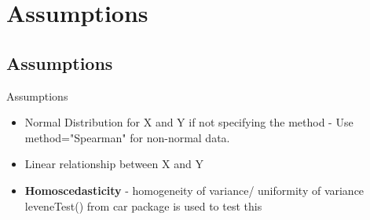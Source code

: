 \documentclass[slidestop,compress,14pt,xcolor=dvipsnames]{beamer}
\begin{document}
\section{Assumptions}
\subsection{Assumptions}
\begin{frame}{Assumptions}
\begin{itemize}
    \item Normal Distribution for X and Y if not specifying the method - Use method="Spearman" for non-normal data.
    \item Linear relationship between X and Y
    \item {\bf Homoscedasticity} - homogeneity of variance/ uniformity of variance 
    leveneTest() from car package is used to test this
\end{itemize}
\end{frame}
\end{document}

